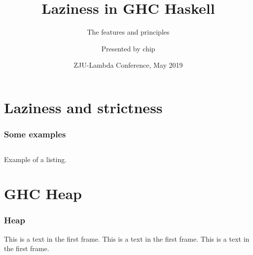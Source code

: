 \documentclass{beamer}
\title[Laziness in GHC Haskell]
{Laziness in GHC Haskell}
\subtitle{The features and principles}
\author[chip]
{Presented by chip}
\institute[ZJU]
{
  ZJU Lambda\\
  From here to World
}
\date[ZJU-Lambda 2019]
{ZJU-Lambda Conference, May 2019}
\begin{document}
\frame{\titlepage}



\section{Laziness and strictness}

\begin{frame}
\frametitle{Some examples}
\begin{listing}[H]
\inputminted{haskell}{a.hs}
\caption{Example of a listing.}
\label{lst:example}
\end{listing}
\end{frame}

\section{GHC Heap}
\begin{frame}
\frametitle{Heap}
This is a text in the first frame. This is a text in the first frame. This is a text in the first frame.
\end{frame}
\end{document}

